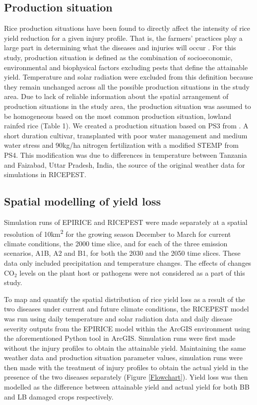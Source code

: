 \documentclass[preprint,review,12pt]{elsarticle}
\begin{document}
    \subsection{Production situation}
    Rice production situations have been found to directly affect the intensity of rice yield reduction for a given injury profile. That is, the farmers' practices play a large part in determining what the diseases and injuries will occur \cite{Savary2000}. For this study, production situation is defined as the combination of socioeconomic, environmental and biophysical factors excluding pests that define the attainable yield. Temperature and solar radiation were excluded from this definition because they remain unchanged across all the possible production situations in the study area. Due to lack of reliable information about the spatial arrangement of production situations in the study area, the production situation was assumed to be homogeneous based on the most common production situation, lowland rainfed rice \cite{Diagne2013} (Table 1). We created a production situation based on PS3 from \citet{Willocquet2004}. A short duration cultivar, transplanted with poor water management and medium water stress and 90kg/ha nitrogen fertilization with a modified STEMP from PS4. This modification was due to differences in temperature between Tanzania and Faizabad, Uttar Pradesh, India, the source of the original weather data for simulations in RICEPEST.
    
    \subsection{Spatial modelling of yield loss}
    Simulation runs of EPIRICE and RICEPEST were made separately at a spatial resolution of 10km\textsuperscript{2} for the growing season December to March for current climate conditions, the 2000 time slice, and for each of the three emission scenarios, A1B, A2 and B1, for both the 2030 and the 2050 time slices. These data only included precipitation and temperature changes. The effects of changes CO$_{2}$ levels on the plant host or pathogens were not considered as a part of this study.
    
    To map and quantify the spatial distribution of rice yield loss as a result of the two diseases under current and future climate conditions, the RICEPEST model was run using daily temperature and solar radiation data and daily disease severity outputs from the EPIRICE model within the ArcGIS environment using the aforementioned Python tool in ArcGIS. Simulation runs were first made without the injury profiles to obtain the attainable yield. Maintaining the same weather data and production situation parameter values, simulation runs were then made with the treatment of injury profiles to obtain the actual yield in the presence of the two diseases separately (Figure \ref{Flowchart}). Yield loss was then modelled as the difference between attainable yield and actual yield for both BB and LB damaged crops respectively.
    
\end{document}
